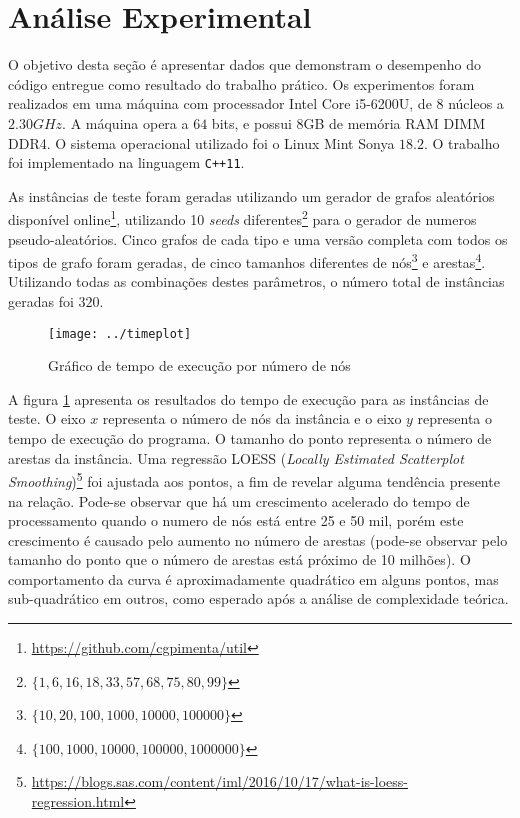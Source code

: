 \section{Análise Experimental} \label{sec:experimentos}

O objetivo desta seção é apresentar dados que demonstram o desempenho  do código entregue como resultado do trabalho prático.  Os experimentos foram realizados em uma máquina com processador Intel\textsuperscript{\textregistered} Core\textsuperscript{\texttrademark} i5-6200U, de 8 núcleos a $2.30GHz$. A máquina opera a $64$ bits, e possui $8$GB de memória RAM DIMM DDR4. O sistema operacional utilizado foi o Linux Mint Sonya $18.2$. O trabalho foi implementado na linguagem \texttt{C++11}. 

As instâncias de teste foram geradas utilizando um gerador de grafos aleatórios disponível online\footnote{\url{https://github.com/cgpimenta/util}}, utilizando 10 \textit{seeds} diferentes\footnote{$\{ 1, 6, 16, 18, 33, 57, 68, 75, 80, 99 \}$} para o gerador de numeros pseudo-aleatórios. Cinco grafos de cada tipo e uma versão completa com todos os tipos de grafo foram geradas, de cinco tamanhos diferentes de nós\footnote{$\{ 10, 20, 100, 1000, 10000, 100000 \}$} e arestas\footnote{$\{ 100, 1000, 10000, 100000, 1000000 \}$}. Utilizando todas as combinações destes parâmetros, o número total de instâncias geradas foi $320$.


\begin{figure}[h]
\centering
\texttt{[image: ../timeplot]}
\caption{Gráfico de tempo de execução por número de nós}
\label{fig:timeplot}
\end{figure}


A figura \ref{fig:timeplot} apresenta os resultados do tempo de execução para as instâncias de teste. O eixo $x$ representa o número de nós da instância e o eixo $y$ representa o tempo de execução do programa. O tamanho do ponto representa o número de arestas da instância. Uma regressão LOESS (\textit{Locally Estimated Scatterplot Smoothing})\footnote{\url{https://blogs.sas.com/content/iml/2016/10/17/what-is-loess-regression.html}} foi ajustada aos pontos, a fim de revelar alguma tendência presente na relação. Pode-se observar que há um crescimento acelerado do tempo de processamento quando o numero de nós está entre 25 e 50 mil, porém este crescimento é causado pelo aumento no número de arestas (pode-se observar pelo tamanho do ponto que o número de arestas está próximo de 10 milhões). O comportamento da curva é aproximadamente quadrático em alguns pontos, mas sub-quadrático em outros, como esperado após a análise de complexidade teórica.


